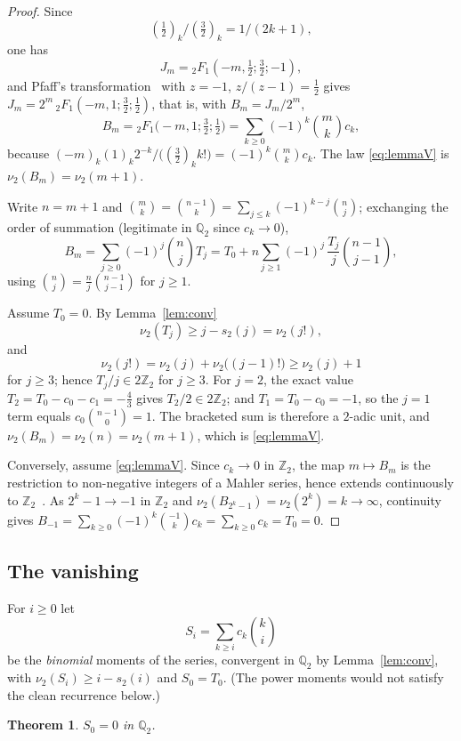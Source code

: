 \documentclass[12pt]{amsart}
\newtheorem{theorem}{Theorem}[section]
\theoremstyle{definition}
\theoremstyle{remark}
\newcommand{\Zt}{\mathbb Z_2}
\newcommand{\Qt}{\mathbb Q_2}
\begin{document}
\begin{proof}
Since 
\[
(\tfrac12)_k/(\tfrac32)_k=1/(2k+1), 
\]
one has
\[
J_m={}_2F_1(-m,\tfrac12;\tfrac32;-1), 
\]
and Pfaff's transformation~\cite[Ch.~2]{AndrewsAskeyRoy} with $z=-1$, $z/(z-1)=\tfrac12$ gives $J_m=2^m\,{}_2F_1(-m,1;\tfrac32;\tfrac12)$, that is, with $B_m=J_m/2^m$,
\[
  B_m={}_2F_1\bigl(-m,1;\tfrac32;\tfrac12\bigr) =\sum_{k\ge0}(-1)^k\binom{m}{k}c_k ,
\]
because $(-m)_k(1)_k2^{-k}/\bigl((\tfrac32)_kk!\bigr)=(-1)^k\binom mkc_k$. The law \eqref{eq:lemmaV} is $\nu_2(B_m)=\nu_2(m+1)$.

Write $n=m+1$ and $\binom mk=\binom{n-1}k=\sum_{j\le k}(-1)^{k-j}\binom nj$; exchanging the order of summation (legitimate in $\Qt$ since $c_k\to0$),
\[
  B_m=\sum_{j\ge0}(-1)^j\binom njT_j =T_0+n\sum_{j\ge1}(-1)^j\,\frac{T_j}{j}\binom{n-1}{j-1},
\]
using $\binom nj=\frac nj\binom{n-1}{j-1}$ for $j\ge1$.

Assume $T_0=0$.  By Lemma~\ref{lem:conv}
\[
\nu_2(T_j)\ge j-s_2(j)=\nu_2(j!),
\]
and 
\[
\nu_2(j!)=\nu_2(j)+\nu_2\bigl((j-1)!\bigr)\ge\nu_2(j)+1
\] 
for $j\ge3$; hence $T_j/j\in2\Zt$ for $j\ge3$.  For $j=2$, the exact value $T_2=T_0-c_0-c_1=-\tfrac43$ gives $T_2/2\in2\Zt$; and $T_1=T_0-c_0=-1$, so the $j=1$ term equals $c_0\binom{n-1}0=1$.  The bracketed sum is therefore a $2$-adic unit, and $\nu_2(B_m)=\nu_2(n)=\nu_2(m+1)$, which is \eqref{eq:lemmaV}.

Conversely, assume \eqref{eq:lemmaV}.  Since $c_k\to0$ in $\Zt$, the map $m\mapsto B_m$ is the restriction to non-negative integers of a Mahler series, hence extends continuously to $\Zt$~\cite[Ch.~4]{Koblitz}.  As $2^k-1\to-1$ in $\Zt$ and $\nu_2(B_{2^k-1})=\nu_2(2^k)=k\to\infty$,
continuity gives $B_{-1}=\sum_{k\ge0}(-1)^k\binom{-1}kc_k=\sum_{k\ge0}c_k=T_0=0$.
\end{proof}

\subsection{The vanishing}

For $i\ge0$ let
\[
  S_i=\sum_{k\ge i}c_k\binom ki
\]
be the \emph{binomial} moments of the series, convergent in $\Qt$ by Lemma~\ref{lem:conv}, with $\nu_2(S_i)\ge i-s_2(i)$ and $S_0=T_0$.  (The power moments would not satisfy the clean recurrence below.)

\begin{theorem}\label{thm:vanish}
$S_0=0$ in $\Qt$.
\end{theorem}
\end{document}
